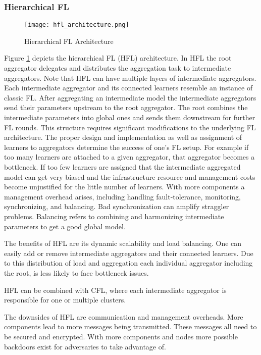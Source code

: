 \subsubsection{Hierarchical FL}
\begin{figure}[h]
    \centering
    \texttt{[image: hfl\_architecture.png]}
    \caption{Hierarchical FL Architecture}
    \label{fig:hfl_architecture}
\end{figure}
Figure \ref{fig:hfl_architecture} depicts the hierarchical FL (HFL) architecture.
In HFL the root aggregator delegates and distributes the aggregation task to 
intermediate aggregators.
Note that HFL can have multiple layers of intermediate aggregators.
Each intermediate aggregator and its connected learners resemble an instance of classic FL.
After aggregating an intermediate model the intermediate aggregators send their parameters
upstream to the root aggregator.
The root combines the intermediate parameters into global ones and sends them downstream for further FL rounds.
This structure requires significant modifications to the underlying FL architecture.
The proper design and implementation as well as assignment of learners to aggregators
determine the success of one's FL setup.
For example if too many learners are attached to a given aggregator, that aggregator becomes a bottleneck.
If too few learners are assigned that the intermediate aggregated model can get
very biased and the infrastructure resource and management costs become unjustified for the little number of learners.
With more components a management overhead arises, including handling fault-tolerance,
monitoring, synchronizing, and balancing.
Bad synchronization can amplify straggler problems.
Balancing refers to combining and harmonizing intermediate parameters to
get a good global model.

The benefits of HFL are its dynamic scalability and load balancing.
One can easily add or remove intermediate aggregators and their connected learners.
Due to this distribution of load and aggregation each individual aggregator including the root,
is less likely to face bottleneck issues.

HFL can be combined with CFL, where each intermediate aggregator is responsible
for one or multiple clusters.

The downsides of HFL are communication and management overheads.
More components lead to more messages being transmitted.
These messages all need to be secured and encrypted.
With more components and nodes more possible backdoors exist for adversaries to take advantage of.

